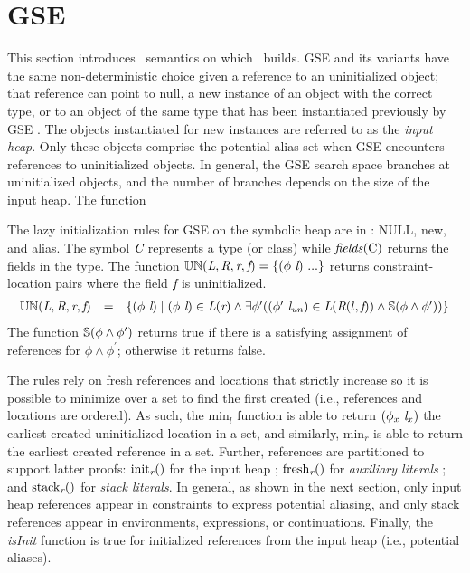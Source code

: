 \section{GSE}
\label{app:gse}
This section introduces \gsetxt\ semantics on which \symtxt\ builds. GSE and its variants have the same non-deterministic choice given a reference to an uninitialized object; that reference can point to null, a new instance of an object with the correct type, or to an object of the same type that has been instantiated previously by GSE \cite{GSE03,KiasanKunit,Cadar:2008,Rosner:2015}. The objects instantiated for new instances are referred to as the \emph{input heap}. Only these objects comprise the potential alias set when GSE encounters references to uninitialized objects. In general, the GSE search space branches at uninitialized objects, and the number of branches depends on the size of the input heap. The function

The lazy initialization rules for GSE on the symbolic heap are in
: NULL, new, and alias.  The symbol $\emph{C}$ represents a type (or class) while $\mathit{fields}( \mathrm{C})$ returns the fields in the type. The function $\mathbb{UN}(\emph{L}, \emph{R}, \emph{r}, \emph{f}) =
\{(\phi\ \emph{l})\ ...\}$ returns constraint-location
pairs where the field $\emph{f}$ is uninitialized.
  \[
\begin{array}{rcl}
\mathbb{UN}(\cfgnt{L}, \cfgnt{R}, \cfgnt{r}, \cfgnt{f}) & = &\{ \lp\phi\ \cfgnt{l}\rp \mid \lp \phi\ \cfgnt{l}\rp  \in \cfgnt{L}\lp \cfgnt{r}\rp  \wedge \exists \phi^\prime \lp \lp \phi^\prime\ \cfgnt{l}_\mathit{un}\rp  \in \cfgnt{L}\lp \cfgnt{R}\lp l,\cfgnt{f}\rp\rp \wedge \mathbb{S}\lp \phi \wedge \phi^\prime \rp\rp\}\\
\end{array}
\]
The function $\mathbb{S}( \phi \wedge \phi^\prime )$ returns true
if there is a satisfying assignment of references for $\phi \wedge
\phi^\prime$; otherwise it returns false.


The rules rely on fresh references and locations that strictly increase so it is possible to minimize over a set to find the first created (i.e., references and locations are ordered). As such, the $\mathrm{min}_l$ function is able to return $(\phi_x\ \cfgnt{l}_x)$ the earliest created uninitialized location in a set, and similarly, $\mathrm{min}_r$ is able to return the earliest created reference in a set. Further, references are partitioned to support latter proofs: $\mathrm{init}_{\emph{r}}()$ for the input
  heap
  ; $\mathrm{fresh}_{\emph{r}}()$ for \emph{auxiliary
  literals}
  ; and $\mathrm{stack}_{\emph{r}}()$ for \emph{stack
    literals}.
  In general, as shown in the next section,
  only input heap references appear in constraints to express potential aliasing, and only stack references appear in environments, expressions, or continuations.  Finally, the \emph{isInit} function is true for initialized references from the input heap (i.e., potential aliases). 

